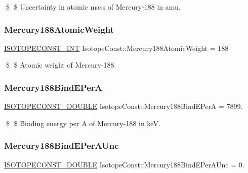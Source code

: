 \$ \$ Uncertainty in atomic mass of Mercury-\/188 in amu. \mbox{\label{group___isotope_const-_mercury-_hg188_gaa96d61f00310c71a36f262d9d8adaecf}} 
\subsubsection{\texorpdfstring{Mercury188\+Atomic\+Weight}{Mercury188AtomicWeight}}
{\footnotesize\ttfamily \mbox{\hyperlink{group___isotope_const-_macros_ga5f18360b3e99483a35c32d789e62621c}{I\+S\+O\+T\+O\+P\+E\+C\+O\+N\+S\+T\+\_\+\+I\+NT}} Isotope\+Const\+::\+Mercury188\+Atomic\+Weight = 188}

\$ \$ Atomic weight of Mercury-\/188. \mbox{\label{group___isotope_const-_mercury-_hg188_ga7f6d7c2c00ee9f8d8f99937070c41db5}} 
\subsubsection{\texorpdfstring{Mercury188\+Bind\+E\+PerA}{Mercury188BindEPerA}}
{\footnotesize\ttfamily \mbox{\hyperlink{group___isotope_const-_macros_ga8f45a7272ce02c0b4c65c44636ed719a}{I\+S\+O\+T\+O\+P\+E\+C\+O\+N\+S\+T\+\_\+\+D\+O\+U\+B\+LE}} Isotope\+Const\+::\+Mercury188\+Bind\+E\+PerA = 7899.}

\$ \$ Binding energy per A of Mercury-\/188 in keV. \mbox{\label{group___isotope_const-_mercury-_hg188_ga39c5f283528a01b9ccad0dbed4127c10}} 
\subsubsection{\texorpdfstring{Mercury188\+Bind\+E\+Per\+A\+Unc}{Mercury188BindEPerAUnc}}
{\footnotesize\ttfamily \mbox{\hyperlink{group___isotope_const-_macros_ga8f45a7272ce02c0b4c65c44636ed719a}{I\+S\+O\+T\+O\+P\+E\+C\+O\+N\+S\+T\+\_\+\+D\+O\+U\+B\+LE}} Isotope\+Const\+::\+Mercury188\+Bind\+E\+Per\+A\+Unc = 0.}

